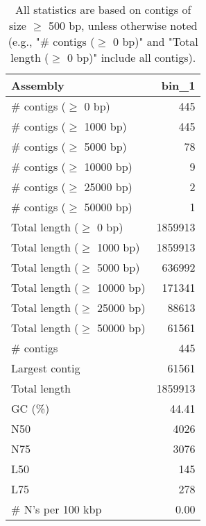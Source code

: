 \documentclass[12pt,a4paper]{article}
\begin{document}
\begin{table}[ht]
\begin{center}
\caption{All statistics are based on contigs of size $\geq$ 500 bp, unless otherwise noted (e.g., "\# contigs ($\geq$ 0 bp)" and "Total length ($\geq$ 0 bp)" include all contigs).}
\begin{tabular}{|l*{1}{|r}|}
\hline
Assembly & bin\_1 \\ \hline
\# contigs ($\geq$ 0 bp) & 445 \\ \hline
\# contigs ($\geq$ 1000 bp) & 445 \\ \hline
\# contigs ($\geq$ 5000 bp) & 78 \\ \hline
\# contigs ($\geq$ 10000 bp) & 9 \\ \hline
\# contigs ($\geq$ 25000 bp) & 2 \\ \hline
\# contigs ($\geq$ 50000 bp) & 1 \\ \hline
Total length ($\geq$ 0 bp) & 1859913 \\ \hline
Total length ($\geq$ 1000 bp) & 1859913 \\ \hline
Total length ($\geq$ 5000 bp) & 636992 \\ \hline
Total length ($\geq$ 10000 bp) & 171341 \\ \hline
Total length ($\geq$ 25000 bp) & 88613 \\ \hline
Total length ($\geq$ 50000 bp) & 61561 \\ \hline
\# contigs & 445 \\ \hline
Largest contig & 61561 \\ \hline
Total length & 1859913 \\ \hline
GC (\%) & 44.41 \\ \hline
N50 & 4026 \\ \hline
N75 & 3076 \\ \hline
L50 & 145 \\ \hline
L75 & 278 \\ \hline
\# N's per 100 kbp & 0.00 \\ \hline
\end{tabular}
\end{center}
\end{table}
\end{document}
